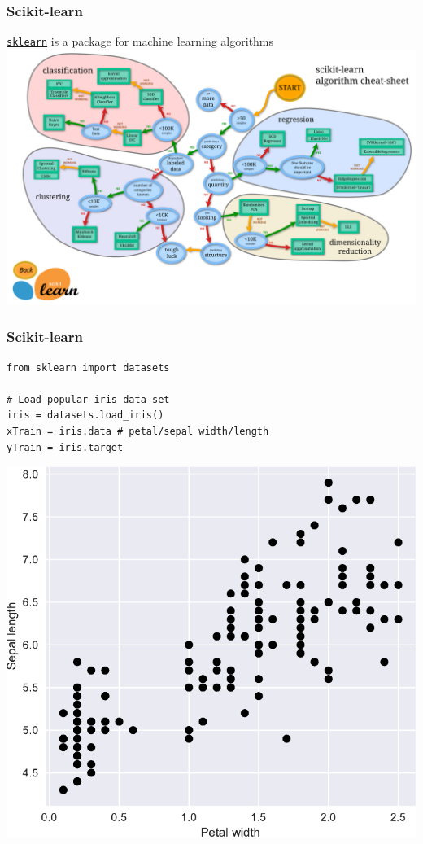 \documentclass[pdf]{beamer}
\begin{document}
\begin{frame}[fragile]
\frametitle{Scikit-learn}

\href{http://scikit-learn.org/stable/index.html}{\texttt{sklearn}} is a package 
for machine learning algorithms
\vfill
\centering
\includegraphics[width=.9\textwidth]{scikitlearn.png}

\end{frame}

\begin{frame}[fragile]
\frametitle{Scikit-learn}

\begin{lstlisting}[style=python]
from sklearn import datasets

# Load popular iris data set
iris = datasets.load_iris()
xTrain = iris.data # petal/sepal width/length
yTrain = iris.target 
\end{lstlisting}


\vspace{-0.5cm}
\centering
\includegraphics[width=.45\textwidth]{kmeans1.pdf}

\end{frame}
\end{document}
